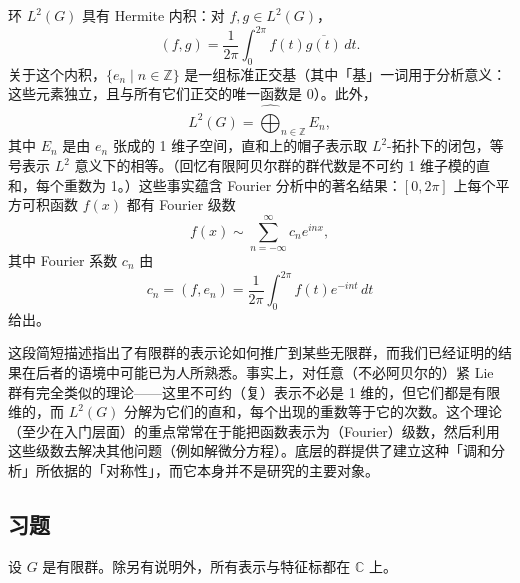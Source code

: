 环 \(L^2(G)\) 具有 Hermite 内积：对 \(f, g \in L^2(G)\)，
\[
(f, g) = \frac{1}{2\pi}\int_0^{2\pi}f(t)\overline{g(t)}\,dt.
\]
关于这个内积，\(\{e_n \mid n \in \mathbb{Z}\}\) 是一组标准正交基（其中「基」一词用于分析意义：这些元素独立，且与所有它们正交的唯一函数是 0）。此外，
\[
L^2(G) = \widehat{\bigoplus}_{n \in \mathbb{Z}}E_n,
\]
其中 \(E_n\) 是由 \(e_n\) 张成的 1 维子空间，直和上的帽子表示取 \(L^2\)-拓扑下的闭包，等号表示 \(L^2\) 意义下的相等。（回忆有限阿贝尔群的群代数是不可约 1 维子模的直和，每个重数为 1。）这些事实蕴含 Fourier 分析中的著名结果：\([0, 2\pi]\) 上每个平方可积函数 \(f(x)\) 都有 Fourier 级数
\[
f(x) \sim \sum_{n=-\infty}^{\infty}c_ne^{inx},
\]
其中 Fourier 系数 \(c_n\) 由
\[
c_n = (f, e_n) = \frac{1}{2\pi}\int_0^{2\pi}f(t)e^{-int}\,dt
\]
给出。

这段简短描述指出了有限群的表示论如何推广到某些无限群，而我们已经证明的结果在后者的语境中可能已为人所熟悉。事实上，对任意（不必阿贝尔的）紧 Lie 群有完全类似的理论——这里不可约（复）表示不必是 1 维的，但它们都是有限维的，而 \(L^2(G)\) 分解为它们的直和，每个出现的重数等于它的次数。这个理论（至少在入门层面）的重点常常在于能把函数表示为（Fourier）级数，然后利用这些级数去解决其他问题（例如解微分方程）。底层的群提供了建立这种「调和分析」所依据的「对称性」，而它本身并不是研究的主要对象。

\subsection*{习题}

设 \(G\) 是有限群。除另有说明外，所有表示与特征标都在 \(\mathbb{C}\) 上。

